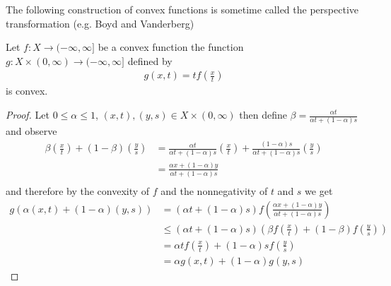 The following construction of convex functions is sometime called the perspective transformation (e.g. Boyd and Vanderberg)
\begin{prop}\label{PerspectiveTransformationOfConvexFunction}Let $f : X \to (-\infty, \infty]$ be a convex function the function $g : X \times (0,\infty) \to (-\infty, \infty]$ defined by 
\begin{align*}
g(x,t) = t f \left ( \frac{x}{t} \right )
\end{align*}
is convex.
\end{prop}
\begin{proof}
Let $0 \leq \alpha \leq 1$, $(x,t), (y,s) \in  X \times (0,\infty)$ then define $\beta = \frac{\alpha t}{\alpha t + (1 - \alpha) s}$ and observe
\begin{align*}
\beta \left(\frac{x}{t} \right)+ (1 - \beta) \left( \frac{y}{s} \right)
&= \frac{\alpha t}{\alpha t + (1 - \alpha) s} \left(\frac{x}{t}\right) +  \frac{(1-\alpha) s}{\alpha t + (1 - \alpha) s} \left( \frac{y}{s} \right) \\
&=\frac{\alpha x + (1-\alpha)  y}{\alpha t + (1 - \alpha) s} \\
\end{align*}
and therefore by the convexity of $f$ and the nonnegativity of $t$ and $s$ we get
\begin{align*}
g(\alpha(x,t) + (1-\alpha)(y,s)) 
&= (\alpha t + (1 - \alpha) s ) f\left(\frac{\alpha x + (1-\alpha)  y}{\alpha t + (1 - \alpha) s} \right ) \\
&\leq  (\alpha t + (1 - \alpha) s) \left( \beta f\left( \frac{x}{t} \right) + (1 - \beta) f\left( \frac{y}{s} \right) \right )\\
&= \alpha t f \left( \frac{x}{t} \right) + (1-\alpha) s  f\left( \frac{y}{s} \right) \\
&=\alpha  g(x,t) + (1-\alpha) g(y,s)
\end{align*}
\end{proof}

